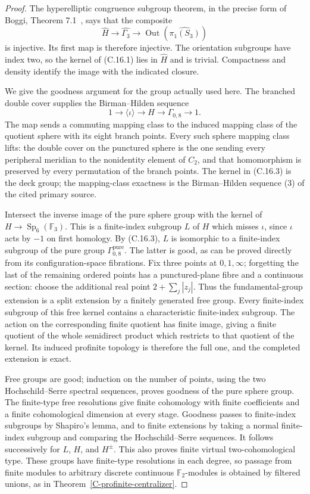 \documentclass[11pt,oneside]{article}
\begin{document}
\begin{proof}
The hyperelliptic congruence subgroup theorem, in the precise
form of Boggi, Theorem 7.1~\cite{CextraBoggiHyperelliptic}, says
that the composite
\[
 \widehat H\longrightarrow\widehat{\Gamma_3}
       \longrightarrow\operatorname{Out}
               (\widehat{\pi_1(S_3)})
\]
is injective. Its first map is therefore injective. The
orientation subgroups have index two, so the kernel of
(C.16.1) lies in $\widehat H$ and is trivial. Compactness and
density identify the image with the indicated closure.

We give the goodness argument for the group actually used here.
The branched double cover supplies the Birman--Hilden sequence
\[
 1\longrightarrow\langle\iota\rangle\longrightarrow H
       \longrightarrow\Gamma_{0,8}\longrightarrow1.
\tag{C.16.3}
\]
The map sends a commuting mapping class to the induced mapping
class of the quotient sphere with its eight branch points.
Every such sphere mapping class lifts: the double cover on the
punctured sphere is the one sending every peripheral meridian
to the nonidentity element of $C_2$, and that homomorphism is
preserved by every permutation of the branch points. The kernel
in (C.16.3) is the deck group; the mapping-class exactness is the
Birman--Hilden sequence (3) of the cited primary source.

Intersect the inverse image of the pure sphere group with the
kernel of $H\to\operatorname{Sp}_6(\mathbb F_3)$. This is a
finite-index subgroup $L$ of $H$ which misses $\iota$, since
$\iota$ acts by $-1$ on first homology. By (C.16.3), $L$ is
isomorphic to a finite-index subgroup of the pure group
$\Gamma_{0,8}^{\mathrm{pure}}$. The latter is good, as can be
proved directly from its configuration-space fibrations.
Fix three points at $0,1,\infty$; forgetting the last of the
remaining ordered points has a punctured-plane fibre and a
continuous section: choose the additional real point
$2+\sum_j|z_j|$. Thus the fundamental-group extension is a
split extension by a finitely generated free group. Every
finite-index subgroup of this free kernel contains a
characteristic finite-index subgroup. The action on the
corresponding finite quotient has finite image, giving a
finite quotient of the whole semidirect product which
restricts to that quotient of the kernel. Its induced
profinite topology is therefore the full one, and the
completed extension is exact.

Free groups are good; induction on the number of points,
using the two Hochschild--Serre spectral sequences, proves
goodness of the pure sphere group. The finite-type free
resolutions give finite cohomology with finite coefficients
and a finite cohomological dimension at every stage.
Goodness passes to finite-index subgroups by Shapiro's lemma,
and to finite extensions by taking a normal finite-index
subgroup and comparing the Hochschild--Serre sequences.
It follows successively for $L$, $H$, and $H^{\pm}$.
This also proves finite virtual two-cohomological type.
These groups have finite-type resolutions in each degree,
so passage from finite modules to arbitrary discrete
continuous $\mathbb F_2$-modules is obtained by filtered
unions, as in Theorem~\ref{C-profinite-centralizer}.


\end{proof}
\end{document}

